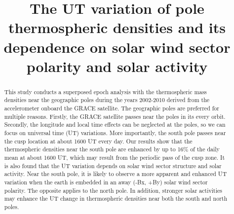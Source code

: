 \documentclass[draft,grl]{/home/gdj/文档/template/agu_template/AGUTeX}
\begin{document}
\title{The UT variation of pole thermospheric densities and its dependence on solar wind sector polarity and solar activity}


\begin{abstract}
This study conducts a superposed epoch analysis with the thermospheric mass densities near the geographic poles during the years 2002-2010 derived from the accelerometer onboard the GRACE satellite. The geographic poles are preferred for multiple reasons. Firstly, the GRACE satellite passes near the poles in its every orbit. Secondly, the longitude and local time effects can be neglected at the poles, so we can focus on universal time (UT) variations. More importantly, the south pole passes near the cusp location at about 1600 UT every day. Our results show that the thermospheric densities near the south pole are enhanced by up to 16\% of the daily mean at about 1600 UT, which may result from the periodic pass of the cusp zone. It is also found that the UT variation depends on solar wind sector structure and solar activity. Near the south pole, it is likely to observe a more apparent and enhanced UT variation when the earth is embedded in an away (-Bx, +By) solar wind sector polarity. The opposite applies to the north pole. In addition, stronger solar activities may enhance the UT change in thermospheric densities near both the south and north poles.
\end{abstract}
\end{document}
